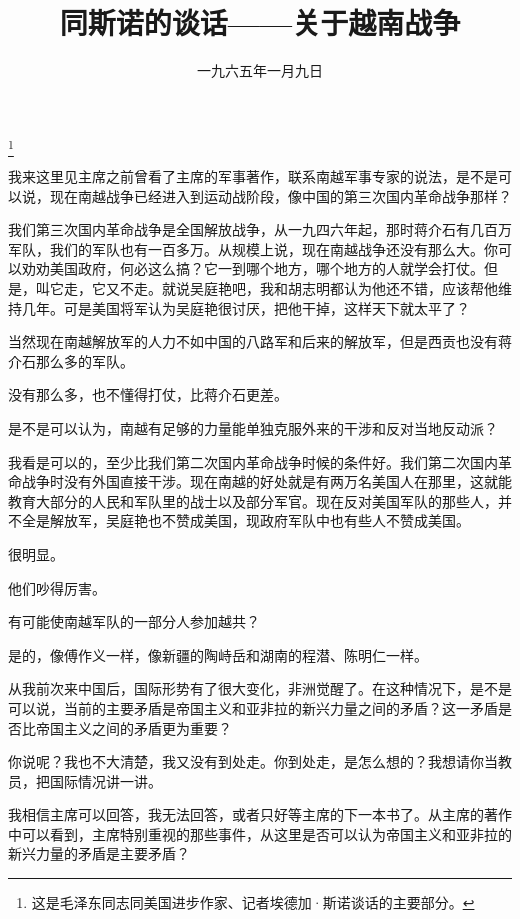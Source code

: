 
\title{同斯诺的谈话——关于越南战争}
\date{一九六五年一月九日}
\thanks{这是毛泽东同志同美国进步作家、记者埃德加·斯诺谈话的主要部分。}
\maketitle


我来这里见主席之前曾看了主席的军事著作，联系南越军事专家的说法，是不是可以说，现在南越战争已经进入到运动战阶段，像中国的第三次国内革命战争那样？

我们第三次国内革命战争是全国解放战争，从一九四六年起，那时蒋介石有几百万军队，我们的军队也有一百多万。从规模上说，现在南越战争还没有那么大。你可以劝劝美国政府，何必这么搞？它一到哪个地方，哪个地方的人就学会打仗。但是，叫它走，它又不走。就说吴庭艳吧，我和胡志明都认为他还不错，应该帮他维持几年。可是美国将军认为吴庭艳很讨厌，把他干掉，这样天下就太平了？

当然现在南越解放军的人力不如中国的八路军和后来的解放军，但是西贡也没有蒋介石那么多的军队。

没有那么多，也不懂得打仗，比蒋介石更差。

是不是可以认为，南越有足够的力量能单独克服外来的干涉和反对当地反动派？

我看是可以的，至少比我们第二次国内革命战争时候的条件好。我们第二次国内革命战争时没有外国直接干涉。现在南越的好处就是有两万名美国人在那里，这就能教育大部分的人民和军队里的战士以及部分军官。现在反对美国军队的那些人，并不全是解放军，吴庭艳也不赞成美国，现政府军队中也有些人不赞成美国。

很明显。

他们吵得厉害。

有可能使南越军队的一部分人参加越共？

是的，像傅作义一样，像新疆的陶峙岳和湖南的程潜、陈明仁一样。

从我前次来中国后，国际形势有了很大变化，非洲觉醒了。在这种情况下，是不是可以说，当前的主要矛盾是帝国主义和亚非拉的新兴力量之间的矛盾？这一矛盾是否比帝国主义之间的矛盾更为重要？

你说呢？我也不大清楚，我又没有到处走。你到处走，是怎么想的？我想请你当教员，把国际情况讲一讲。

我相信主席可以回答，我无法回答，或者只好等主席的下一本书了。从主席的著作中可以看到，主席特别重视的那些事件，从这里是否可以认为帝国主义和亚非拉的新兴力量的矛盾是主要矛盾？

